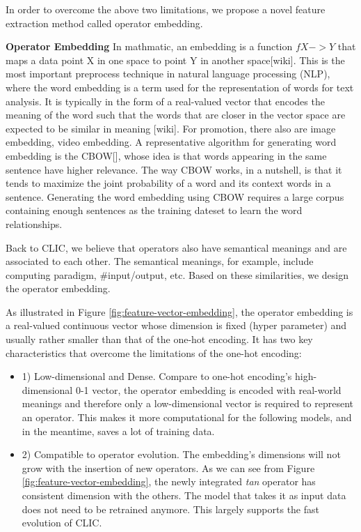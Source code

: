 In order to overcome the above two limitations, we propose a novel feature extraction method called operator embedding.

\textbf{Operator Embedding}
In mathmatic, an embedding is a function $f X -> Y$ that maps a data point X in one space to point Y in another space[wiki]. 
This is the most important preprocess technique in natural language processing (NLP), where the word embedding is a term used for the representation of words for text analysis. 
It is typically in the form of a real-valued vector that encodes the meaning of the word such that the words that are closer in the vector space are expected to be similar in meaning [wiki]. 
For promotion, there also are image embedding, video embedding. 
A representative algorithm for generating word embedding is the CBOW[], whose idea is that words appearing in the same sentence have higher relevance. 
The way CBOW works, in a nutshell, is that it tends to maximize the joint probability of a word and its context words in a sentence. 
Generating the word embedding using CBOW requires a large corpus containing enough sentences as the training dateset to learn the word relationships.

Back to CLIC, we believe that operators also have semantical meanings and are associated to each other.
The semantical meanings, for example, include computing paradigm, \#input/output, etc.
Based on these similarities, we design the operator embedding.

As illustrated in Figure \ref{fig:feature-vector-embedding}, 
the operator embedding is a real-valued continuous vector whose dimension is fixed (hyper parameter) and usually rather smaller than that of the one-hot encoding.
It has two key characteristics that overcome the limitations of the one-hot encoding:
\begin{itemize}
  \item 1) Low-dimensional and Dense. 
  Compare to one-hot encoding's high-dimensional 0-1 vector, 
  the operator embedding is encoded with real-world meanings and therefore only a low-dimensional vector is required to represent an operator.
  This makes it more computational for the following models, and in the meantime, saves a lot of training data.
  \item 2) Compatible to operator evolution. The embedding's dimensions will not grow with the insertion of new operators. 
  As we can see from Figure \ref{fig:feature-vector-embedding}, the newly integrated \textit{tan} operator has consistent dimension with the others.
  The model that takes it as input data does not need to be retrained anymore. 
  This largely supports the fast evolution of CLIC.
\end{itemize}

